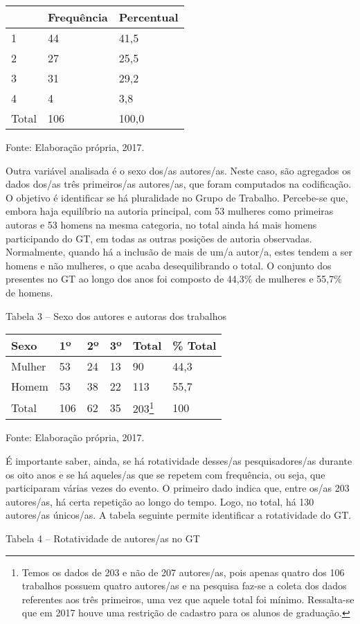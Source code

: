 \begin{longtable}[]{@{}lll@{}}
\toprule
~ & Frequência & Percentual\tabularnewline
\midrule
\endhead
1 & 44 & 41,5\tabularnewline
2 & 27 & 25,5\tabularnewline
3 & 31 & 29,2\tabularnewline
4 & 4 & 3,8\tabularnewline
Total & 106 & 100,0\tabularnewline
\bottomrule
\end{longtable}

Fonte: Elaboração própria, 2017.

Outra variável analisada é o sexo dos/as autores/as. Neste caso, são
agregados os dados dos/as três primeiros/as autores/as, que foram
computados na codificação. O objetivo é identificar se há pluralidade no
Grupo de Trabalho. Percebe-se que, embora haja equilíbrio na autoria
principal, com 53 mulheres como primeiras autoras e 53 homens na mesma
categoria, no total ainda há mais homens participando do GT, em todas as
outras posições de autoria observadas. Normalmente, quando há a inclusão
de mais de um/a autor/a, estes tendem a ser homens e não mulheres, o que
acaba desequilibrando o total. O conjunto dos presentes no GT ao longo
dos anos foi composto de 44,3\% de mulheres e 55,7\% de homens.

Tabela 3 -- Sexo dos autores e autoras dos trabalhos

\begin{longtable}[]{@{}llllll@{}}
\toprule
Sexo & 1º & 2º & 3º & Total & \% Total\tabularnewline
\midrule
\endhead
Mulher & 53 & 24 & 13 & 90 & 44,3\tabularnewline
Homem & 53 & 38 & 22 & 113 & 55,7\tabularnewline
Total & 106 & 62 & 35 & 203\footnote{Temos os dados de 203 e não de 207
  autores/as, pois apenas quatro dos 106 trabalhos possuem quatro
  autores/as e na pesquisa faz-se a coleta dos dados referentes aos três
  primeiros, uma vez que aquele total foi mínimo. Ressalta-se que em
  2017 houve uma restrição de cadastro para os alunos de graduação.} &
100\tabularnewline
\bottomrule
\end{longtable}

Fonte: Elaboração própria, 2017.

É importante saber, ainda, se há rotatividade desses/as pesquisadores/as
durante os oito anos e se há aqueles/as que se repetem com frequência,
ou seja, que participaram várias vezes do evento. O primeiro dado indica
que, entre os/as 203 autores/as, há certa repetição ao longo do tempo.
Logo, no total, há 130 autores/as únicos/as. A tabela seguinte permite
identificar a rotatividade do GT.

Tabela 4 -- Rotatividade de autores/as no GT

